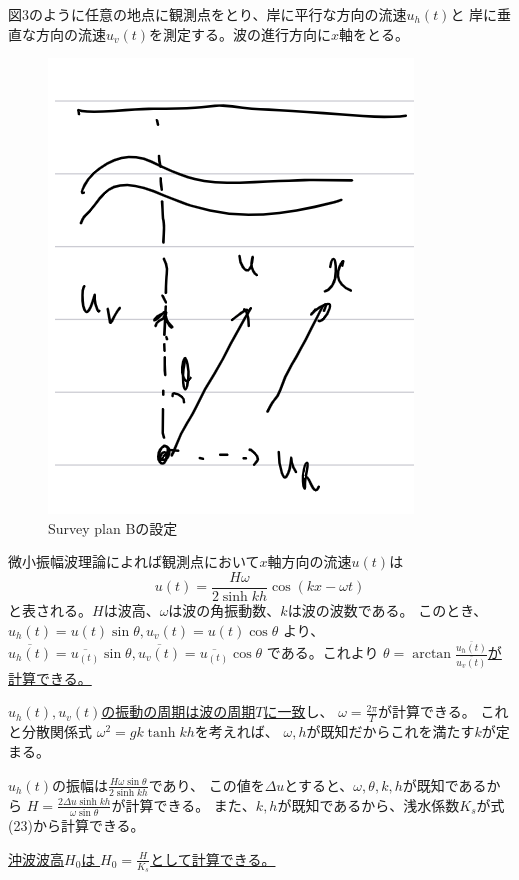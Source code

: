 \documentclass[a4paper]{jsarticle}
\begin{document}
\subsubsection{}
図3のように任意の地点に観測点をとり、岸に平行な方向の流速$u_h(t)$と
岸に垂直な方向の流速$u_v(t)$を測定する。波の進行方向に$x$軸をとる。\par
\begin{figure}[htb]
  \centering
  \includegraphics[width=0.3\hsize]{fig3.png}
  \caption{Survey plan Bの設定}
\end{figure}
微小振幅波理論によれば観測点において$x$軸方向の流速$u(t)$は
\begin{equation}
  u(t) = \frac{H \omega}{2 \sinh k h} \cos (k x - \omega t)
\end{equation}
と表される。$H$は波高、$\omega$は波の角振動数、$k$は波の波数である。
このとき、
$u_h(t) = u(t) \sin \theta, u_v(t) = u(t) \cos \theta$
より、
$\overline{u_h(t)} = \overline{u_(t)} \sin \theta, \overline{u_v(t)} = \overline{u_(t)} \cos \theta$
である。これより
\underline{$\theta = \arctan \frac{\overline{u_h(t)}}{\overline{u_v(t)}}$が計算できる。} \par
\underline{$u_h(t),u_v(t)$の振動の周期は波の周期$T$に一致}し、
$\omega = \frac{2 \pi}{T}$が計算できる。
これと分散関係式
$\omega^2 = g k \tanh k h$を考えれば、
$\omega, h$が既知だからこれを満たす$k$が定まる。\par
$u_h(t)$の振幅は$\frac{H \omega \sin \theta}{2 \sinh k h}$であり、
この値を$\varDelta u$とすると、$\omega, \theta, k, h$が既知であるから
$H = \frac{2 \varDelta u \sinh k h}{\omega \sin \theta}$が計算できる。
また、$k, h$が既知であるから、浅水係数$K_s$が式(23)から計算できる。\par
\underline{沖波波高$H_0$は
$H_0 = \frac{H}{K_s}$として計算できる。}
\end{document}
